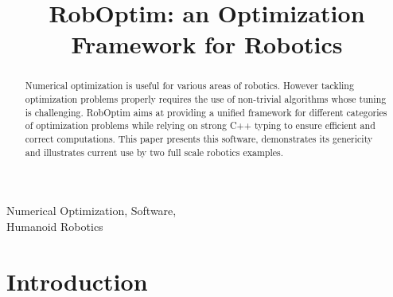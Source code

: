 \documentclass[conference,final,a4paper,twocolumn,9pt]{IEEEtran}
\begin{document}
\title{RobOptim: an Optimization Framework for Robotics}
%
\author{%
%
%
%
%
}%
%
\maketitle

\begin{abstract}
\boldmath Numerical optimization is useful for various areas of
robotics. However tackling optimization problems properly requires the
use of non-trivial algorithms whose tuning is challenging. RobOptim
aims at providing a unified framework for different categories of
optimization problems while relying on strong C++ typing to ensure
efficient and correct computations. This paper presents this software,
demonstrates its genericity and illustrates current use by two full
scale robotics examples.
\end{abstract}

\begin{IEEEkeywords}
  Numerical Optimization, Software,\\Humanoid Robotics
\end{IEEEkeywords}

\IEEEpeerreviewmaketitle

\section{Introduction}\label{sec:introduction}
\end{document}
